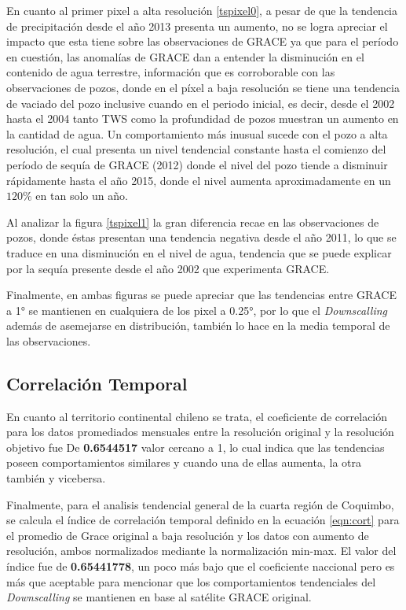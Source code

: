 En cuanto al primer pixel a alta resolución \ref{tspixel0}, a pesar de que la tendencia de precipitación desde el año 2013 presenta un aumento, no se logra apreciar el impacto que esta tiene sobre las observaciones de GRACE
ya que para el período en cuestión, las anomalías de GRACE dan a entender la disminución en el contenido de agua terrestre, información que es corroborable con las observaciones de pozos, donde en el píxel a baja resolución se tiene una 
tendencia de vaciado del pozo inclusive cuando en el periodo inicial, es decir, desde el 2002 hasta el 2004 tanto TWS como la profundidad de pozos muestran un aumento en la cantidad de agua. Un comportamiento más inusual sucede con el pozo a alta resolución,
el cual presenta un nivel tendencial constante hasta el comienzo del período de sequía de GRACE (2012) donde el nivel del pozo tiende a disminuir rápidamente hasta el año 2015, donde el nivel aumenta aproximadamente en un $120\%$ en tan solo un año. 

Al analizar la figura \ref{tspixel1} la gran diferencia recae en las observaciones de pozos, donde éstas presentan una tendencia negativa desde el año 2011, lo que se traduce en una disminución en el nivel de agua, tendencia que se puede
explicar por la sequía presente desde el año 2002 que experimenta GRACE.

Finalmente, en ambas figuras se puede apreciar que las tendencias entre GRACE a 1° se mantienen en cualquiera de los pixel a 0.25°, por lo que el \textit{Downscalling} además de asemejarse en distribución, también lo hace 
en la media temporal de las observaciones.


\subsection{Correlación Temporal}
En cuanto al territorio continental chileno se trata, el coeficiente de correlación para los datos promediados mensuales entre la resolución original y la resolución objetivo fue De
\textbf{0.6544517} valor cercano a 1, lo cual indica que las tendencias poseen comportamientos similares y cuando una de ellas aumenta, la otra también y vicebersa.

Finalmente, para el analisis tendencial general de la cuarta región de Coquimbo, se calcula el índice de correlación temporal definido en la ecuación \ref{eqn:cort}
para el promedio de Grace original a baja resolución y los datos con aumento de resolución, ambos normalizados mediante la normalización min-max. El valor del índice 
fue de \textbf{0.65441778}, un poco más bajo que el coeficiente naccional pero es más que aceptable para mencionar que los comportamientos tendenciales del \textit{Downscalling} se mantienen
en base al satélite GRACE original.

